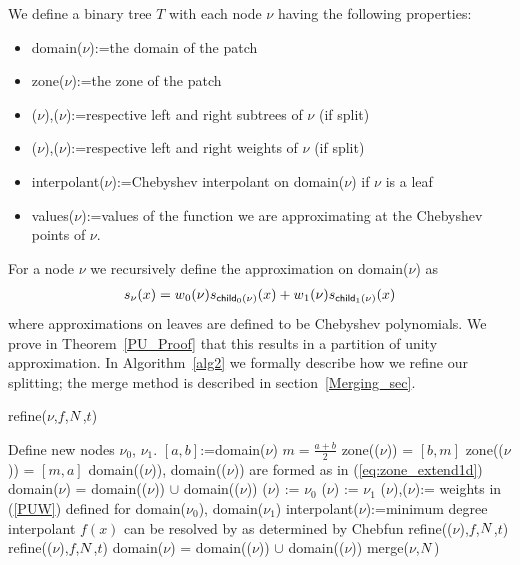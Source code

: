 We define a binary tree $T$ with each node $\nu$ having the following properties:
\begin{itemize}
\item \textsf{domain}($\nu$):=the domain of the patch
\item \textsf{zone}($\nu$):=the zone of the patch
\item {}($\nu$),($\nu$):=respective left and right subtrees of $\nu$ (if split)
\item {}($\nu$),($\nu$):=respective left and right weights of $\nu$ (if split)
\item \textsf{interpolant}($\nu$):=Chebyshev interpolant on \textsf{domain}($\nu$) if $\nu$ is a leaf
\item \textsf{\textsf{values}}($\nu$):=values of the function we are approximating at the Chebyshev points of $\nu$.
\end{itemize}

For a node $\nu$ we recursively define the approximation on \textsf{domain}($\nu$) as
\begin{align}
s_{\nu}(x) = w\textsubscript{0}(\nu) s_{\text{\textsf{child}$_{0}$($\nu$)}}(x) + w\textsubscript{1}(\nu) s_{\text{\textsf{child}$_{1}$($\nu$)}}(x)
\end{align}
where approximations on leaves are defined to be Chebyshev polynomials. We prove in Theorem~\ref{PU_Proof} that this results in a partition of unity approximation. In Algorithm~\ref{alg2} we formally describe how we refine our splitting; the merge method is described in section~\ref{Merging_sec}. 

\begin{algorithm}[!h]
\caption{refine($\nu$,$f$,$N$,$t$)}
\label{alg2}
\begin{algorithmic}
\STATE Define new nodes $\nu_0$, $\nu_1$.
\STATE $[a,b]$:=\textsf{domain}($\nu$)
\STATE $m = \frac{a+b}{2}$
\STATE \textsf{zone}(($\nu$)) = $[b,m]$
\STATE \textsf{zone}(($\nu$)) = $[m,a]$
\STATE \textsf{domain}(($\nu$)), \textsf{domain}(($\nu$)) are formed as in (\ref{eq:zone_extend1d})
\STATE \textsf{domain}($\nu$) = \textsf{domain}(($\nu$)) $\cup$ \textsf{domain}(($\nu$))
\STATE {}($\nu$) := $\nu_0$
\STATE {}($\nu$) := $\nu_1$
\STATE {}($\nu$),($\nu$):= weights in (\ref{PUW}) defined for \textsf{domain}($\nu_0$), \textsf{domain}($\nu_1$)
\STATE \textsf{interpolant}($\nu$):=minimum degree \textsf{interpolant} $f(x)$ can be resolved by \ARP 
as determined by Chebfun
\ELSE
\STATE refine(($\nu$),$f$,$N$,$t$)
\STATE refine(($\nu$),$f$,$N$,$t$)
\STATE \textsf{domain}($\nu$) = \textsf{domain}(($\nu$)) $\cup$ \textsf{domain}(($\nu$))
\STATE merge($\nu$,$N$)
\ENDIF
\end{algorithmic}
\end{algorithm}

